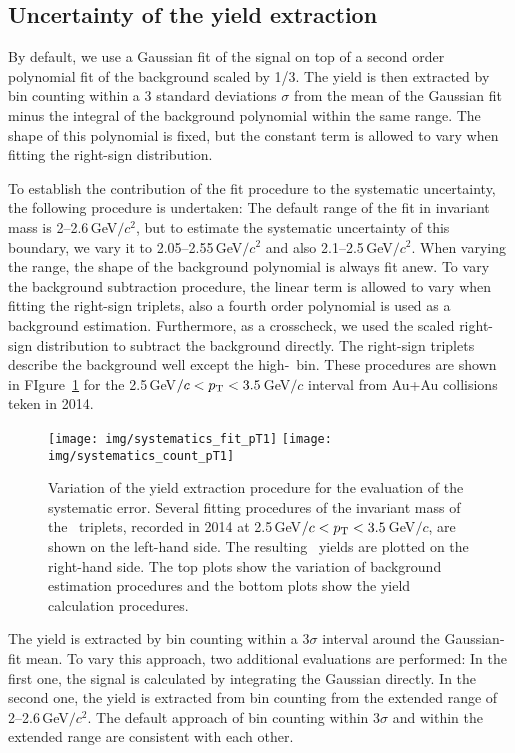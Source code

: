 \subsection{Uncertainty of the yield extraction}
By default,  we use a Gaussian fit of the signal on top of a second order polynomial fit of the background scaled by 1/3\@. The yield is then extracted by bin counting within a 3 standard deviations $\sigma$ from the mean of the Gaussian fit minus the integral of the background polynomial within the same range. The shape of this polynomial is fixed, but the constant term is allowed to vary when fitting the right-sign distribution.

To establish the contribution of the fit procedure to the systematic uncertainty, the following procedure is undertaken: The default range of the fit in invariant mass is 2--2.6$\,$GeV$/c^2$, but to estimate the systematic uncertainty of this boundary, we vary it to  2.05--2.55$\,$GeV$/c^2$ and also 2.1--2.5$\,$GeV$/c^2$\@.  When varying the range, the shape of the background polynomial is always fit anew. To vary the background subtraction procedure, the linear term is allowed to vary when fitting the right-sign triplets, also a fourth order polynomial is used as a background estimation. Furthermore, as a crosscheck, we used the scaled right-sign distribution to subtract the background directly. The right-sign triplets describe the background well except the high-\pt\ bin. These procedures are shown in FIgure~\ref{syst_pT1} for the 2.5$\,$GeV$/c < {p_{\mathrm{T}}} < 3.5\,$GeV$/c$ interval from Au+Au collisions teken in 2014\@.

\begin{figure}[!htb]
\centering
\texttt{[image: img/systematics\_fit\_pT1]}
\texttt{[image: img/systematics\_count\_pT1]}
\caption{\label{syst_pT1} Variation of the yield extraction procedure for the evaluation of the systematic error. Several fitting procedures of the invariant mass of the \pKpi\ triplets, recorded in 2014 at 2.5$\,$GeV$/c < {p_{\mathrm{T}}} < 3.5\,$GeV$/c$, are shown on the left-hand side\@. The resulting \Lambdac\ yields are plotted on the right-hand side. The top plots show the variation of background estimation procedures and the bottom plots show the yield calculation procedures.}
\end{figure}

The yield is extracted by bin counting within a 3$\sigma$ interval around the Gaussian-fit mean. To vary this approach, two additional evaluations are performed: In the first one, the signal is calculated by integrating the Gaussian directly. In the second one, the yield is extracted from bin counting from the extended range of 2--2.6$\,$GeV$/c^2$\@. The default approach of bin counting within 3$\sigma$ and within the extended range are consistent with each other.



